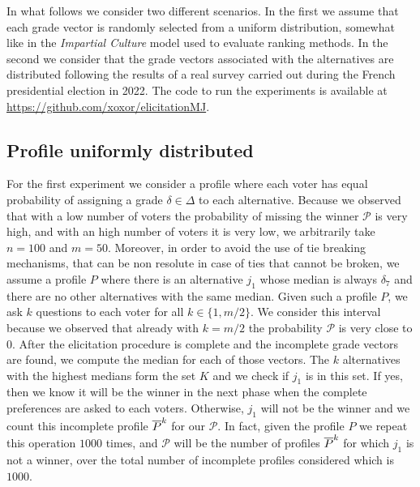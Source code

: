 	In what follows we consider two different scenarios. In the first we assume that each grade vector is randomly selected from a uniform distribution, somewhat like in the \textit{Impartial Culture} model used to evaluate ranking methods. In the second we consider that the grade vectors associated with the alternatives are distributed following the results of a real survey carried out during the French presidential election in 2022. The code to run the experiments is available at \url{	https://github.com/xoxor/elicitationMJ}.

	\subsection{Profile uniformly distributed}
	For the first experiment we consider a profile where each voter has equal probability of assigning a grade $\delta \in \Delta$ to each alternative. Because we observed that with a low number of voters the probability of missing the winner $\mathcal{P}$ is very high, and with an high number of voters it is very low, we arbitrarily take $n=100$ and $m=50$. Moreover, in order to avoid the use of tie breaking mechanisms, that can be non resolute in case of ties that cannot be broken, we assume a profile $P$ where there is an alternative $j_1$ whose median is always $\delta_7$ and there are no other alternatives with the same median. 
	Given such a profile $P$, we ask $k$ questions to each voter for all $k\in \{1,m/2\}$. We consider this interval because we observed that already with $k=m/2$ the probability $\mathcal{P}$ is very close to $0$. After the elicitation procedure is complete and the incomplete grade vectors are found, we compute the median for each of those vectors. The $k$ alternatives with the highest medians form the set $K$ and we check if $j_1$ is in this set. If yes, then we know it will be the winner in the next phase when the complete preferences are asked to each voters. Otherwise, $j_1$ will not be the winner and we count this incomplete profile $\overline{P}^k$ for our $\mathcal{P}$. In fact, given the profile $P$ we repeat this operation $1000$ times, and $\mathcal{P}$ will be the number of profiles $\overline{P}^k$ for which $j_1$ is not a winner, over the total number of incomplete profiles considered which is $1000$. 
